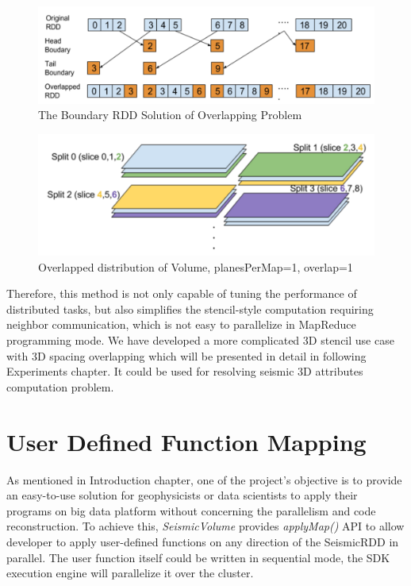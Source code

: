 \begin{figure}[h]
\centering
\includegraphics[scale=0.5]{figures/boundaryRDD.png}
\caption{The Boundary RDD Solution of Overlapping Problem}
\label{boundaryRDD}
\end{figure}

\begin{figure}[h]
\centering
\includegraphics[scale=0.5]{figures/Overlap.png}
\caption{Overlapped distribution of Volume, planesPerMap=1, overlap=1}
\label{Overlap}
\end{figure}

Therefore, this method is not only capable of tuning the performance of distributed tasks, but also simplifies the stencil-style computation requiring neighbor communication, which is not easy to parallelize in MapReduce programming mode. We have developed a more complicated 3D stencil use case with 3D spacing overlapping which will be presented in detail in following Experiments chapter. It could be used for resolving seismic 3D attributes computation problem.


\section{User Defined Function Mapping}

As mentioned in Introduction chapter, one of the project's objective is to provide an easy-to-use solution for geophysicists or data scientists to apply their programs on big data platform without concerning the parallelism and code reconstruction. To achieve this, \emph{SeismicVolume} provides \emph{applyMap()} API to allow developer to apply user-defined functions on any direction of the SeismicRDD in parallel. The user function itself could be written in sequential mode, the SDK execution engine will parallelize it over the cluster.

